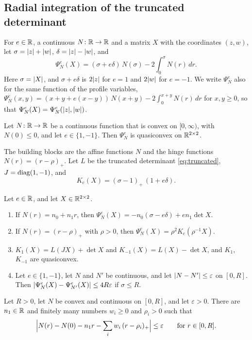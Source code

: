 \subsection{Radial integration of the truncated determinant}\label{sec:radial}

For $e\in\mathbb{R}$, a continuous $N\colon\mathbb{R}\to\mathbb{R}$ and a matrix $X$ with the coordinates $(z,w)$, let
$\sigma=\lvert z\rvert+\lvert w\rvert$, $\delta=\lvert z\rvert-\lvert w\rvert$, and
\[
  \Psi^e_N(X)=(\sigma+e\delta)\,N(\sigma)-2\int_0^\sigma N(r)\,dr .
\]
Here $\sigma=\lvert X\rvert$, and $\sigma+e\delta$ is $2\lvert z\rvert$ for $e=1$ and $2\lvert w\rvert$ for $e=-1$. We
write $\Psi^e_N$ also for the same function of the profile variables,
$\Psi^e_N(x,y)=(x+y+e(x-y))\,N(x+y)-2\int_0^{x+y}N(r)\,dr$ for $x,y\ge0$, so that
$\Psi^e_N(X)=\Psi^e_N(\lvert z\rvert,\lvert w\rvert)$.

\begin{proposition}\label{prop:radial}
Let $N\colon\mathbb{R}\to\mathbb{R}$ be a continuous function that is convex on $[0,\infty)$, with
$N(0)\le0$, and let $e\in\{1,-1\}$. Then $\Psi^e_N$ is quasiconvex on $\mathbb{R}^{2\times 2}$.
\end{proposition}

The building blocks are the affine functions $N$ and the hinge functions $N(r)=(r-\rho)_+$. Let
$L$ be the truncated determinant \eqref{eq:truncated}, $J=\operatorname{diag}(1,-1)$, and
\[
  K_e(X)=(\sigma-1)_+\,(1+e\delta).
\]

\begin{lemma}\label{lem:radial}
Let $e\in\mathbb{R}$, and let $X\in\mathbb{R}^{2\times 2}$.
\begin{enumerate}[label=\textup{(\alph*)}]
\item If $N(r)=n_0+n_1r$, then $\Psi^e_N(X)=-n_0(\sigma-e\delta)+en_1\det X$.
\item If $N(r)=(r-\rho)_+$ with $\rho>0$, then $\Psi^e_N(X)=\rho^2K_e(\rho^{-1}X)$.
\item $K_1(X)=L(JX)+\det X$ and $K_{-1}(X)=L(X)-\det X$, and $K_1$, $K_{-1}$ are quasiconvex.
\item Let $e\in\{1,-1\}$, let $N$ and $N'$ be continuous, and let $\lvert N-N'\rvert\le\varepsilon$ on
  $[0,R]$. Then $\lvert \Psi^e_N(X)-\Psi^e_{N'}(X)\rvert\le4R\varepsilon$ if $\sigma\le R$.
\end{enumerate}
\end{lemma}

\begin{lemma}\label{lem:hinge}
Let $R>0$, let $N$ be convex and continuous on $[0,R]$, and let $\varepsilon>0$. There are
$n_1\in\mathbb{R}$ and finitely many numbers $w_i\ge0$ and $\rho_i>0$ such that
\[
  \Bigl\lvert N(r)-N(0)-n_1r-\sum_iw_i\,(r-\rho_i)_+\Bigr\rvert\le\varepsilon\qquad
  \text{for }r\in[0,R].
\]
\end{lemma}

